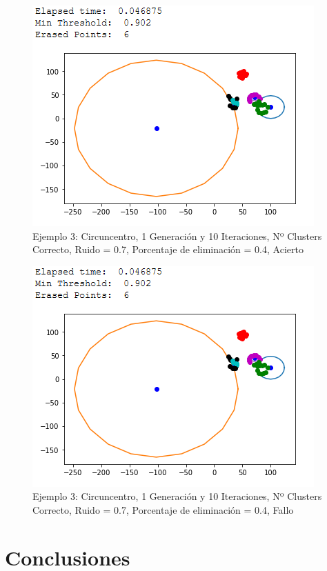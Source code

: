 \documentclass[conference,a4paper]{IEEEtran}
\begin{document}
\begin{figure}[H]
\centering
\includegraphics[scale=0.65]{Experimentacion/Ejemplo3/ej3_c_1_10_re_wrong}
\caption{Ejemplo 3: Circuncentro, 1 Generación y 10 Iteraciones,  Nº Clusters Correcto, Ruido = 0.7, Porcentaje de eliminación = 0.4, Acierto\\}
\end{figure}

\begin{figure}[H]
\centering
\includegraphics[scale=0.65]{Experimentacion/Ejemplo3/ej3_c_1_10_re_wrong}
\caption{Ejemplo 3: Circuncentro, 1 Generación y 10 Iteraciones,  Nº Clusters Correcto, Ruido = 0.7, Porcentaje de eliminación = 0.4, Fallo\\}
\end{figure}

\section{Conclusiones}
\end{document}
